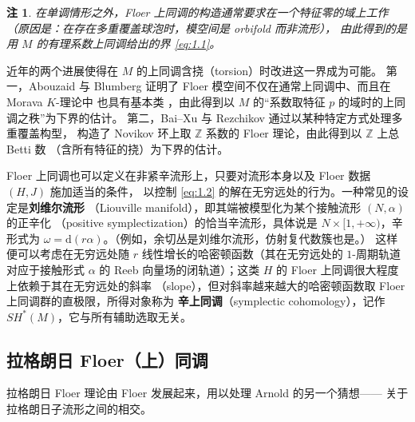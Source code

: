 \documentclass[UTF8,a4paper,11pt,fontset=windows]{ctexart}
\theoremstyle{cnthm}
\newtheorem{rem}[thm]{注}
\numberwithin{equation}{section}
\newcommand{\Z}{\mathbb{Z}}
\newcommand{\SH}{SH}                  %
\begin{document}
\begin{rem}\label{rem:1.2}
在单调情形之外，Floer 上同调的构造通常要求在一个特征零的域上工作
（原因是：在存在多重覆盖球泡时，模空间是 orbifold 而非流形），
由此得到的是用 $M$ 的有理系数上同调给出的界 \eqref{eq:1.1}。
\end{rem}

近年的两个进展使得在 $M$ 的上同调含挠（torsion）时改进这一界成为可能。
第一，Abouzaid 与 Blumberg 证明了 Floer 模空间不仅在通常上同调中、而且在 Morava $K$-理论中
也具有基本类 \cite{r8}，由此得到以 $M$ 的“系数取特征 $p$ 的域时的上同调之秩”为下界的估计。
第二，Bai--Xu \cite{r26} 与 Rezchikov \cite{r88} 通过以某种特定方式处理多重覆盖构型，
构造了 Novikov 环上取 $\Z$ 系数的 Floer 理论，由此得到以 $\Z$ 上总 Betti 数
（含所有特征的挠）为下界的估计。


Floer 上同调也可以定义在非紧辛流形上，只要对流形本身以及 Floer 数据 $(H,J)$ 施加适当的条件，
以控制 \eqref{eq:1.2} 的解在无穷远处的行为。一种常见的设定是\textbf{刘维尔流形}
（Liouville manifold），即其端被模型化为某个接触流形 $(N,\alpha)$ 的正辛化
（positive symplectization）的恰当辛流形，具体说是 $N\times[1,+\infty)$，辛形式为
$\omega=\mathrm{d}(r\alpha)$。（例如，余切丛是刘维尔流形，仿射复代数簇也是。）
这样便可以考虑在无穷远处随 $r$ 线性增长的哈密顿函数（其在无穷远处的 $1$-周期轨道对应于接触形式
$\alpha$ 的 Reeb 向量场的闭轨道）；这类 $H$ 的 Floer 上同调很大程度上依赖于其在无穷远处的斜率
（slope），但对斜率越来越大的哈密顿函数取 Floer 上同调群的直极限，所得对象称为
\textbf{辛上同调}（symplectic cohomology），记作 $\SH^{*}(M)$，它与所有辅助选取无关。

\subsection{拉格朗日 Floer（上）同调}

拉格朗日 Floer 理论由 Floer \cite{r39} 发展起来，用以处理 Arnold 的另一个猜想——
关于拉格朗日子流形之间的相交。
\end{document}
